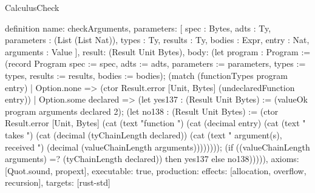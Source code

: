 \begin{lexlean}{CalculusCheck}
\begin{semanticmodule}
definition{
  name: checkArguments,
  parameters: [
    spec : Bytes,
    adts : Ty,
    parameters : (List (List Nat)),
    types : Ty,
    results : Ty,
    bodies : Expr,
    entry : Nat,
    arguments : Value
  ],
  result: (Result Unit Bytes),
  body: (let program : Program := (record Program {spec := spec, adts := adts, parameters := parameters, types := types, results := results, bodies := bodies}); (match (functionTypes program entry)
    | Option.none => (ctor Result.error [Unit, Bytes] (undeclaredFunction entry))
    | Option.some declared => (let yes137 : (Result Unit Bytes) := (valueOk program arguments declared 2); (let no138 : (Result Unit Bytes) := (ctor Result.error [Unit, Bytes] (cat (text "function ") (cat (decimal entry) (cat (text " takes ") (cat (decimal (tyChainLength declared)) (cat (text " argument(s), received ") (decimal (valueChainLength arguments)))))))); (if ((valueChainLength arguments) =? (tyChainLength declared)) then yes137 else no138))))),
  axioms: [Quot.sound, propext],
  executable: true,
  production: {effects: [allocation, overflow, recursion], targets: [rust-std]}
}
\end{semanticmodule}
\end{lexlean}
